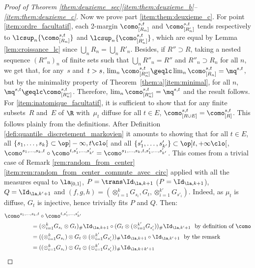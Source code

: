 \begin{proof}[Proof of Theorem \ref{them:deuxieme_sec}\eqref{item:them:deuxieme_b}--\eqref{item:them:deuxieme_c}]
Now we prove part \eqref{item:them:deuxieme_c}. For point \eqref{item:ordre_facultatif}, each 2-margin $\como_{[R_n]}^{s,t}$ and $\como_{[R'_n]}^{s,t}$ tends respectively to $\lcsup_n\{\como_{[R_n]}^{s,t}\}$ and $\lcsup_n\{\como_{[R'_n]}^{s,t}\}$, which are equal by Lemma \ref{lem:croissance_lc} since $\bigcup_nR_n=\bigcup_nR'_n$. Besides, if $R''\supset R$, taking a nested sequence $(R''_n)_n$ of fini\-te sets such that $\bigcup_n R''_n=R''$ and $R''_n\supset R_n$ for all $n$, we get that, for any~$s$ and~$t>\nobreak s$, $\lim_n\como_{[R''_n]}^{s,t}\geqlc \lim_n\como_{[R_n]}^{s,t}=\mq^{s,t}$, but by the minimality property~of \hbox{Theorem}~\ref{them:a}\eqref{item:minimal}, for all $n$, $\mq^{s,t}\geqlc\como_{[R''_n]}^{s,t}$. Therefore, $\lim_n\como_{[R''_n]}^{s,t}=\mq^{s,t}$ and the result follows. For \eqref{item:inatomique_facultatif}, it is sufficient to show that for any finite subsets~$R$ and~$E$ of $\R$ with~$\mu_t$ diffuse for all $t\in E$, $\como_{[R\cup E]}^{s,t}=\como_{[R]}^{s,t}$. This follows plainly from the definitions. After Definition \ref{defi:quantile_discretement_markovien} it amounts to showing that for all $t\in E$, all $\{s_1,\ldots,s_k\}\subset\op]-\infty,t\clo[$ and all $\{s'_1,\ldots,s'_{k'}\}\subset\op]t,+\infty\clo[$, $\como^{s_1,\ldots,s_k,t}\circ\como^{t,s'_1,\ldots,s'_{k'}}=\como^{s_1,\ldots,s_{k},t,s'_1,\ldots,s'_{k'}}$. This comes from a trivial case of Remark \ref{rem:random_from_center}\eqref{item:rem:random_from_center_commute_avec_circ} applied with all the measures equal to $\la_{[0,1]}$, $P=\trans\Id_{\la,k+1}$ (\ie $P=\Id_{\la,k+1}$), $Q=\Id_{\la,k'+1}$ and $(f,g,h)=(\otimes_{i=1}^k G_{s_i},G_t,\otimes_{i=1}^{k'} G_{s'_i})$. Indeed, as $\mu_t$ is diffuse, $G_t$ is injective, hence trivially fits $P$ and $Q$. Then:\vspace*{-3pt}\enlargethispage{.6\baselineskip}%
\begin{align*}
\como^{s_1,\ldots,s_k,t}&\circ\como^{t,s'_1,\ldots,s'_{k'}}\\
&\hspace*{-5mm}=(\otimes_{i=1}^k G_{s_i}\otimes G_t)_\#\Id_{\la,k+1}\circ(G_t\otimes (\otimes_{i=1}^{k'} G_{s'_i}))_\#\Id_{\la,k'+1}\ \ \text{by definition of $\como$}\\
&\hspace*{-5mm}=((\otimes_{i=1}^k G_{s_i})\otimes G_t\otimes (\otimes_{i=1}^{k'} G_{s'_i}))_\#\Id_{\la,k+1}\circ\Id_{\la,k'+1}\ \ \text{by the remark}\\
&\hspace*{-5mm}=((\otimes_{i=1}^k G_{s_i})\otimes G_t \otimes (\otimes_{i=1}^{k'} G_{s'_i}))_\#\Id_{\la,k+k'+1}\\

\end{align*}
\end{proof}
